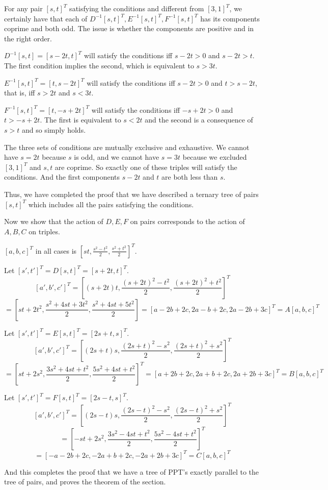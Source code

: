 \documentclass[12pt]{article}
\begin{document}
For any pair $[s,t]^T$ satisfying the conditions and different from $[3,1]^T$, we certainly have that each of $D^{-1}[s,t]^T, E^{-1}[s,t]^T,F^{-1}[s,t]^T$ has its components coprime and both odd.   The issue is whether the components are positive and in the right order.

$D^{-1}[s,t] = [s-2t,t]^T$ will satisfy the conditions iff $s-2t >0$ and $s-2t>t$.   The first condition implies the second, which is equivalent to $s>3t$.

$E^{-1}[s,t]^T = [t,s-2t]^T$ will satisfy the conditions iff $s-2t>0$ and $t>s-2t$, that is, iff $s>2t$ and $s<3t$.

$F^{-1}[s,t]^T = [t,-s+2t]^T$ will satisfy the conditions iff $-s+2t>0$ and $t>-s+2t$.   The first is equivalent to $s<2t$ and the second is a consequence of $s>t$ and so simply holds.

The three sets of conditions are mutually exclusive and exhaustive.   We cannot have $s=2t$ because $s$ is odd, and we cannot have $s=3t$ because we excluded $[3,1]^T$ and $s,t$ are coprime.  So exactly one of these triples will satisfy the conditions.   And the first components $s-2t$ and $t$ are both less than $s$.

Thus, we have completed the proof that we have described a ternary tree of pairs $[s,t]^T$ which includes all the pairs satisfying the conditions.

Now we show that the action of $D,E,F$ on pairs corresponds to the action of $A,B,C$ on triples.


$[a,b,c]^T$ in all cases is $[st,\frac{s^2-t^2}2,\frac{s^2+t^2}2]^T$.

Let $[s',t']^T = D[s,t]^T = [s+2t,t]^T$.   $$[a',b',c']^T = [(s+2t)t,\frac{(s+2t)^2-t^2}2,\frac{(s+2t)^2+t^2}2]^T $$ $$ = [st+2t^2,\frac{s^2+4st+3t^2}2,\frac{s^2+4st+5t^2}2]=[a-2b+2c,2a-b+2c,2a-2b+3c]^T = A[a,b,c]^T$$

Let $[s',t']^T = E[s,t]^T = [2s+t,s]^T$.   $$[a',b',c']^T = [(2s+t)s,\frac{(2s+t)^2-s^2}2,\frac{(2s+t)^2+s^2}2]^T $$ $$ = [st+2s^2,\frac{3s^2+4st+t^2}2,\frac{5s^2+4st+t^2}2]^T=[a+2b+2c,2a+b+2c,2a+2b+3c]^T = B[a,b,c]^T$$

Let $[s',t']^T = F[s,t]^T = [2s-t,s]^T$.   $$[a',b',c']^T = [(2s-t)s,\frac{(2s-t)^2-s^2}2,\frac{(2s-t)^2+s^2}2]^T $$ $$ = [-st+2s^2,\frac{3s^2-4st+t^2}2,\frac{5s^2-4st+t^2}2]^T$$ $$=[-a-2b+2c,-2a+b+2c,-2a+2b+3c]^T = C[a,b,c]^T$$

And this completes the proof that we have a tree of PPT's exactly parallel to the tree of pairs, and proves the theorem of the section.
\end{document}
